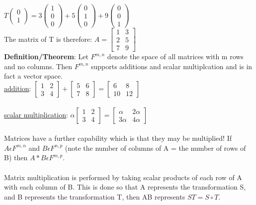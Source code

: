 \documentclass{article}
\begin{document}
$T\begin{pmatrix} 0 \\ 1 \end{pmatrix} = 3 \begin{pmatrix} 1 \\ 0 \\ 0 \end{pmatrix} + 5 \begin{pmatrix} 0 \\ 1\\0 \end{pmatrix} + 9 \begin{pmatrix} 0 \\ 0\\1 \end{pmatrix}$\\
The matrix of T is therefore: $A = \begin{bmatrix} 1 & 3\\2 &5 \\ 7 &9 \end{bmatrix}$\\
\textbf{Definition/Theorem}: Let $F^{m,n}$ denote the space of all matrices with m rows and no columns. Then $F^{m,n}$ supports additions and scalar multiplcation and is in fact a vector space. \\
\underline{addition}: $\begin{bmatrix} 1&2\\3&4 \end{bmatrix} + \begin{bmatrix} 5&6\\7&8 \end{bmatrix} = \begin{bmatrix} 6&8\\10&12 \end{bmatrix}$\\\\
\underline{scalar multiplication}: $\alpha \begin{bmatrix} 1&2\\3&4 \end{bmatrix} = \begin{bmatrix} \alpha & 2\alpha \\ 3\alpha & 4\alpha \end{bmatrix}$\\\\
Matrices have a further capability which is that they may be multiplied! If $A \epsilon F^{m,n}$ and $B \epsilon F^{n,p}$ (note the number of columns of A = the number of rows of B) then $A*B \epsilon F^{m,p}$. \\\\
Matrix multiplication is performed by taking scalar products of each row of A with each column of B. This is done so that A represents the transformation S, and B represents the transformation T, then AB represents $ST = S \circ T$.
\end{document}
